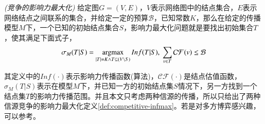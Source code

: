 \begin{definition}
\emph{(竞争的影响力最大化)}
\label{def:competitive-infmax}
给定图$G=(V, E)$，$V$表示网络图中的结点集合，$E$表示网络结点之间联系的集合，并给定一定的预算$\mathcal{B}$，已知常数$K$，那么在给定的传播模型$M$下，一个已知的初始结点集合$S$，影响力最大化问题就是要找出初始集合$T$，使其满足下面式子，
\begin{displaymath}
\sigma_{M}(T|S) = \mathop{\rm argmax} \limits_{|T|=K \wedge T \subseteq (V \setminus S)} Inf(T|S), ~ \sum_{v \in T} \mathcal{CF}(v) \leq \mathcal{B}
\end{displaymath}
\end{definition}

其定义中的$Inf(\cdot)$表示影响力传播函数(算法)，$\mathcal{CF}(\cdot)$是结点估值函数，$\sigma_{M}(T|S)$表示在模型$M$下，并已知一方的初始结点集$S$情况下，另一方找到一个结点集$T$的影响力传播范围。并且本文只考虑两种信源的传播，所以只给出了两种信源竞争的影响力最大化定义\ref{def:competitive-infmax}。若是对多方博弈感兴趣，可以参考\cite{bharathi2007competitive}。



